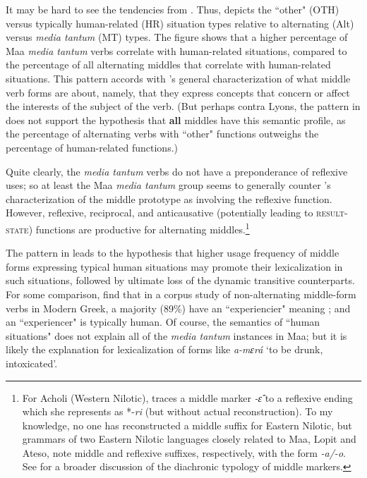 \documentclass[output=paper,colorlinks,citecolor=brown
]{langscibook}
\begin{document}
It may be hard to see the tendencies from .  Thus,  depicts the ``other" (OTH) versus typically human-related (HR) situation types relative to alternating (Alt) versus \textit{media tantum} (MT) types. The figure shows that a higher percentage of Maa \textit{media tantum} verbs correlate with human-related situations, compared to the percentage of all alternating middles that correlate with human-related situations. This pattern accords with \citet{Lyons1968}'s general characterization of what middle verb forms are about, namely, that they express concepts that concern or affect the interests of the subject of the verb. (But perhaps contra Lyons, the pattern in  does not support the hypothesis that \textbf{all} middles have this semantic profile, as the percentage of alternating verbs with ``other" functions outweighs the percentage of human-related functions.)

\largerpage
Quite clearly, the \textit{media tantum} verbs do not have a preponderance of reflexive uses; so at least the Maa \textit{media tantum} group seems to generally counter \citet{Kemmer1993}'s characterization of the middle prototype as involving the reflexive function. However, reflexive, reciprocal, and anticausative (potentially leading to \textsc{result-state}) functions are productive for alternating middles.\footnote{For Acholi (Western Nilotic), \citet[194--196]{Kemmer1993} traces a middle marker \textit{-ɛ̂} to a reflexive ending which she represents as *-\textit{ri} (but without actual reconstruction). To my knowledge, no one has reconstructed a middle suffix for Eastern Nilotic, but grammars of two Eastern Nilotic languages closely related to Maa, Lopit and Ateso, note middle \citep{Moodie2019} and reflexive \citep{Barasa2017} suffixes, respectively, with the form \textit{-a/-o}. See \citet{Inglese2023} for a broader discussion of the  diachronic typology of middle markers.}

The pattern in  leads to the hypothesis that higher usage frequency of middle forms expressing typical human situations may promote their lexicalization in such situations, followed by ultimate loss of the dynamic transitive counterparts. For some comparison, \citet{ZombolouAlexiadou2014} find that in a corpus study of non-alternating middle-form verbs in Modern Greek, a majority (89\%) have an ``experiencier" meaning \citep[337]{ZombolouAlexiadou2014}; and an ``experiencer" is typically human. Of course, the semantics of ``human situations" does not explain all of the \textit{media tantum} instances in Maa; but it is likely the explanation for lexicalization of forms like \textit{a-mɛrá} `to be drunk, intoxicated'.
\end{document}
